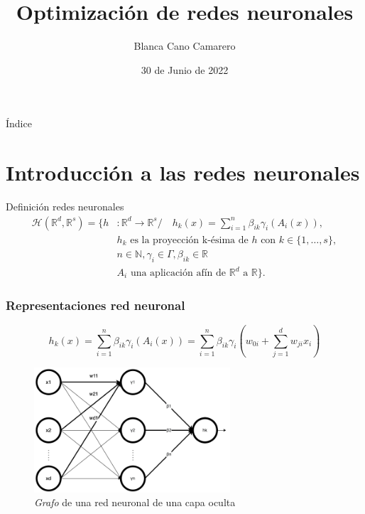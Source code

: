 \documentclass{beamer}
\title{Optimización de redes neuronales}
\author{Blanca Cano Camarero}
\date{30 de Junio de 2022}
\newcommand{\R}{\mathbb{R}}
\newcommand{\N}{\mathbb{N}}
\begin{document}
\begin{frame}
    \titlepage 
\end{frame}


\begin{frame}{Índice}
    \tableofcontents
\end{frame}
\section{Introducción a las redes neuronales}

\begin{frame}{Definición redes neuronales}
    \pause
    \begin{align*}
        \mathcal{H}(\R^d,\R^s) 
            =
            \{
                h &: \R^d \longrightarrow \R^s 
                 /\quad 
                h_k(x) = 
                \sum_{i=1}^{n} \beta_{i k} \gamma_{i}( A_{i}(x)), \\
                & \text{$h_k$  es la proyección k-ésima de $h$ con 
                $k \in \{1, \ldots, s\}$}, \\
                & n \in \N,\gamma_{i} \in \Gamma , \beta_{i k} \in \R \\
                &A_{i} \text{ una aplicación afín de $\R^d$ a $\R$}           
            \}.
    \end{align*}
\end{frame}
\begin{frame}
    \frametitle{Representaciones red neuronal}
    \begin{equation*}
        h_k(x) =  \sum_{i=1}^{n} \beta_{i k} \gamma_{i}( A_{i}(x))
        = 
        \sum_{i=1}^{n} \beta_{i k} \gamma_{i}
        \left(
            w_{0 i} + \sum_{j=1}^d w_{j i } x_i
        \right) 
    \end{equation*}
    \begin{figure}[h!]
        \centering
        \includegraphics[width=0.65\textwidth]{1-Introduccion_redes_neuronales/Red-Neuronal-una-capa-simple.png}
        \caption{\textit{Grafo} de una red neuronal de una capa oculta}
        \label{img:grafo-red-neuronal-una-capa-oculta_repeticion}
    \end{figure}

\end{frame}
\end{document}
